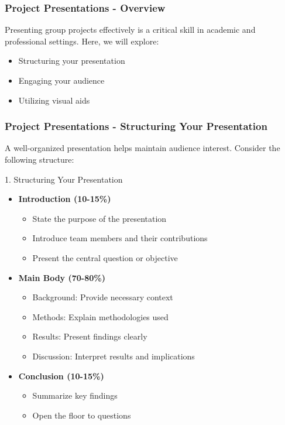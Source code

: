 \documentclass[aspectratio=169]{beamer}
\begin{document}
\begin{frame}[fragile]
    \frametitle{Project Presentations - Overview}
    Presenting group projects effectively is a critical skill in academic and professional settings. 
    Here, we will explore:
    \begin{itemize}
        \item Structuring your presentation
        \item Engaging your audience
        \item Utilizing visual aids
    \end{itemize}
\end{frame}

\begin{frame}[fragile]
    \frametitle{Project Presentations - Structuring Your Presentation}
    A well-organized presentation helps maintain audience interest. Consider the following structure:

    \begin{block}{1. Structuring Your Presentation}
        \begin{itemize}
            \item \textbf{Introduction (10-15\%)}  
                \begin{itemize}
                    \item State the purpose of the presentation
                    \item Introduce team members and their contributions
                    \item Present the central question or objective
                \end{itemize}
            \item \textbf{Main Body (70-80\%)}  
                \begin{itemize}
                    \item Background: Provide necessary context
                    \item Methods: Explain methodologies used
                    \item Results: Present findings clearly
                    \item Discussion: Interpret results and implications
                \end{itemize}
            \item \textbf{Conclusion (10-15\%)}  
                \begin{itemize}
                    \item Summarize key findings 
                    \item Open the floor to questions
                \end{itemize}
        \end{itemize}
    \end{block}
\end{frame}
\end{document}
